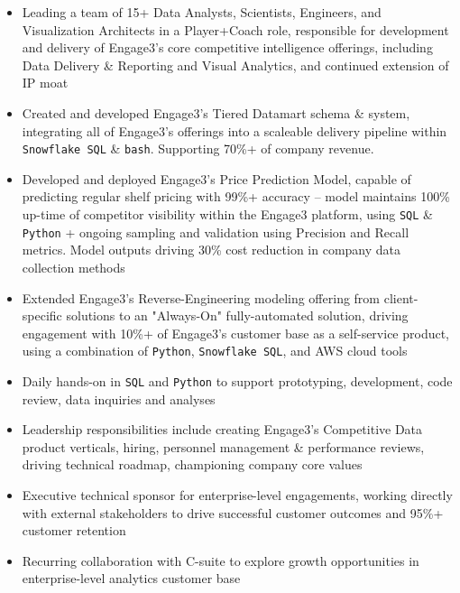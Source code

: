 \documentclass[]{deedy-resume-openfont}
\begin{document}
\begin{itemize} %
\item Leading a team of 15+ Data Analysts, Scientists, Engineers, and Visualization Architects in a Player+Coach role, responsible for development and delivery of Engage3's core competitive intelligence offerings, including Data Delivery \& Reporting and Visual Analytics, and continued extension of IP moat
\item Created and developed Engage3's Tiered Datamart schema \& system, integrating all of Engage3's offerings into a scaleable delivery pipeline within \verb|Snowflake SQL| \& \verb|bash|.  Supporting 70\%+ of company revenue.
\item Developed and deployed Engage3's Price Prediction Model, capable of predicting regular shelf pricing with 99\%+ accuracy -- model maintains 100\% up-time of competitor visibility within the Engage3 platform, using \verb|SQL| \& \verb|Python| + ongoing sampling and validation using Precision and Recall metrics.  Model outputs driving 30\% cost reduction in company data collection methods
\item Extended Engage3's Reverse-Engineering modeling offering from client-specific solutions to an "Always-On" fully-automated solution, driving engagement with 10\%+ of Engage3's customer base as a self-service product, using a combination of \verb|Python|, \verb|Snowflake SQL|, and AWS cloud tools
\item Daily hands-on in \verb|SQL| and \verb|Python| to support prototyping, development, code review, data inquiries and analyses
\item Leadership responsibilities include creating Engage3's Competitive Data product verticals, hiring, personnel management \& performance reviews, driving technical roadmap, championing company core values
\item Executive technical sponsor for enterprise-level engagements, working directly with external stakeholders to drive successful customer outcomes and 95\%+ customer retention
\item Recurring collaboration with C-suite to explore growth opportunities in enterprise-level analytics customer base
\end{itemize} %



\sectionsep
\end{document}
